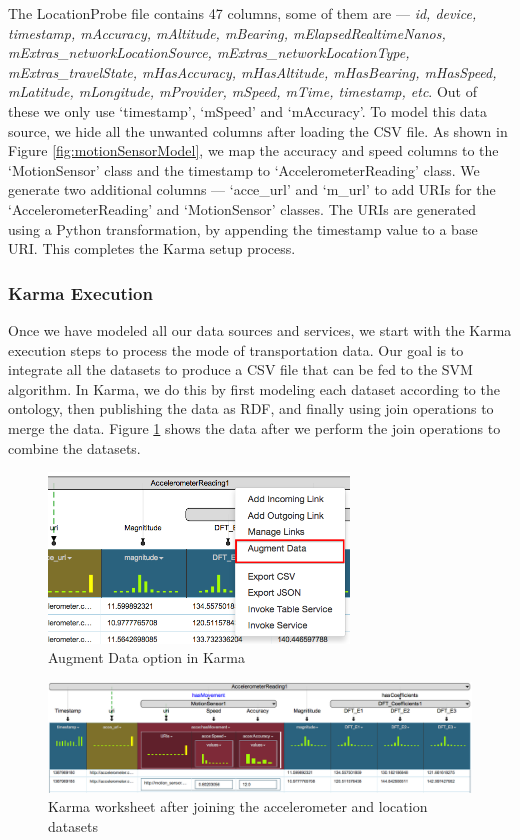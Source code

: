 The LocationProbe file contains 47 columns, some of them are --- \textit{id, device, timestamp, mAccuracy, mAltitude, mBearing, mElapsedRealtimeNanos, mExtras\_networkLocationSource, mExtras\_networkLocationType, mExtras\_travelState, mHasAccuracy, mHasAltitude, mHasBearing, mHasSpeed, mLatitude, mLongitude, mProvider, mSpeed, mTime, timestamp, etc}. Out of these we only use `timestamp', `mSpeed' and `mAccuracy'. To model this data source, we hide all the unwanted columns after loading the CSV file. As shown in Figure \ref{fig:motionSensorModel}, we map the accuracy and speed columns to the `MotionSensor' class and the timestamp to `AccelerometerReading' class. We generate two additional columns --- `acce\_url' and `m\_url' to add URIs for the `AccelerometerReading' and `MotionSensor' classes. The URIs are generated using a Python transformation, by appending the timestamp value to a base URI. This completes the Karma setup process.

\subsubsection{Karma Execution} 
Once we have modeled all our data sources and services, we start with the Karma execution steps to process the mode of transportation data. Our goal is to integrate all the datasets to produce a CSV file that can be fed to the SVM algorithm. In Karma, we do this by first modeling each dataset according to the ontology, then publishing the data as RDF, and finally using join operations to merge the data. Figure \ref{fig:augment_data_menu} shows the data after we perform the join operations to combine the datasets.

\begin{figure}[h]
\centering
\includegraphics[width=80mm]{img/augment_data_menu}
\caption{Augment Data option in Karma}
\label{fig:augment_data_menu}
\end{figure}

\begin{figure}[bp]
\centering
\includegraphics[width=184mm]{img/model_after_augmentation}
\caption{Karma worksheet after joining the accelerometer and location datasets}
\label{fig:model_after_augmentation}
\end{figure}

